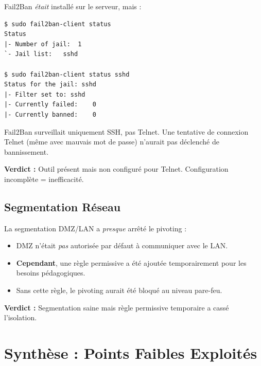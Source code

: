 \documentclass[12pt,a4paper,openany]{report}
\begin{document}
Fail2Ban \textit{était} installé sur le serveur, mais :

\begin{lstlisting}[style=logstyle,caption=Configuration Fail2Ban : Telnet non surveille]
$ sudo fail2ban-client status
Status
|- Number of jail:	1
`- Jail list:	sshd

$ sudo fail2ban-client status sshd
Status for the jail: sshd
|- Filter set to: sshd
|- Currently failed:	0
|- Currently banned:	0
\end{lstlisting}

Fail2Ban surveillait uniquement SSH, pas Telnet. Une tentative de connexion Telnet (même avec mauvais mot de passe) n'aurait pas déclenché de bannissement.

\textbf{Verdict :} Outil présent mais non configuré pour Telnet. Configuration incomplète = inefficacité.

\subsection{Segmentation Réseau}

La segmentation DMZ/LAN a \textit{presque} arrêté le pivoting :

\begin{itemize}
	\item DMZ n'était \textit{pas} autorisée par défaut à communiquer avec le LAN.
	\item \textbf{Cependant}, une règle permissive a été ajoutée temporairement pour les besoins pédagogiques.
	\item Sans cette règle, le pivoting aurait été bloqué au niveau pare-feu.
\end{itemize}

\textbf{Verdict :} Segmentation saine mais règle permissive temporaire a cassé l'isolation.

\section{Synthèse : Points Faibles Exploités}
\end{document}
